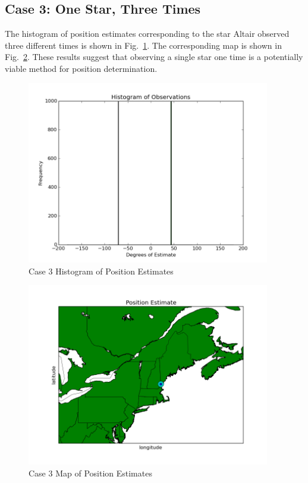 \documentclass[12pt,a4paper]{book}
\begin{document}
\FloatBarrier
\subsection*{Case 3: One Star, Three Times} 
The histogram of position estimates corresponding to the star Altair observed three different times is shown in Fig.~\ref{f:1s3t_z_z}.  The corresponding map is shown in Fig.~\ref{f:1s3t_z_z_map}.  These results suggest that observing a single star one time is a potentially viable method for position determination.
\begin{figure}[!h]%
\centering
\includegraphics[height=8cm]{1s3t_z_z.png}
\caption{Case 3 Histogram of Position Estimates}
\label{f:1s3t_z_z}
\end{figure}
\begin{figure}[!h]%
\centering
\includegraphics[height=8cm]{1s3t_z_z_map.png}
\caption{Case 3 Map of Position Estimates}
\label{f:1s3t_z_z_map}
\end{figure}

\FloatBarrier
\end{document}
